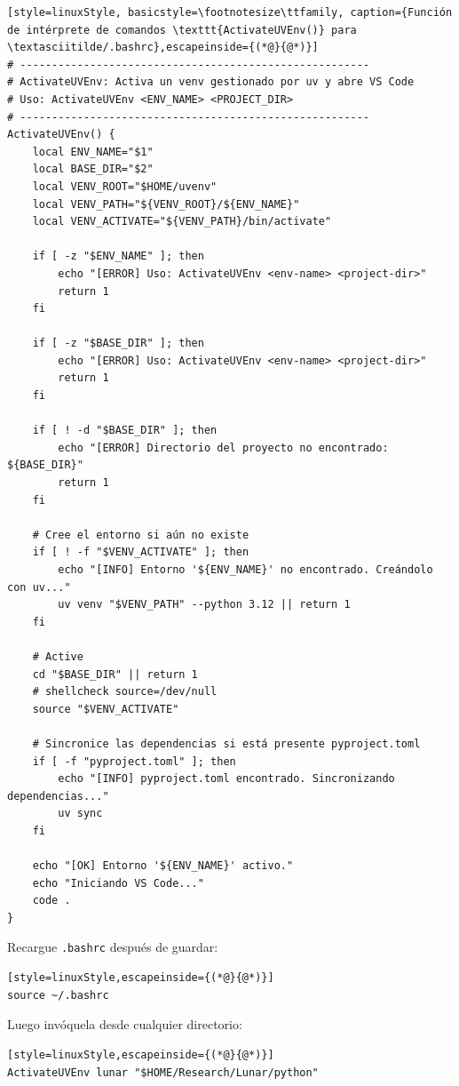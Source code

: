 \begin{lstlisting}[style=linuxStyle, basicstyle=\footnotesize\ttfamily, caption={Función de intérprete de comandos \texttt{ActivateUVEnv()} para \textasciitilde/.bashrc},escapeinside={(*@}{@*)}]
# -------------------------------------------------------
# ActivateUVEnv: Activa un venv gestionado por uv y abre VS Code
# Uso: ActivateUVEnv <ENV_NAME> <PROJECT_DIR>
# -------------------------------------------------------
ActivateUVEnv() {
    local ENV_NAME="$1"
    local BASE_DIR="$2"
    local VENV_ROOT="$HOME/uvenv"
    local VENV_PATH="${VENV_ROOT}/${ENV_NAME}"
    local VENV_ACTIVATE="${VENV_PATH}/bin/activate"

    if [ -z "$ENV_NAME" ]; then
        echo "[ERROR] Uso: ActivateUVEnv <env-name> <project-dir>"
        return 1
    fi

    if [ -z "$BASE_DIR" ]; then
        echo "[ERROR] Uso: ActivateUVEnv <env-name> <project-dir>"
        return 1
    fi

    if [ ! -d "$BASE_DIR" ]; then
        echo "[ERROR] Directorio del proyecto no encontrado: ${BASE_DIR}"
        return 1
    fi

    # Cree el entorno si aún no existe
    if [ ! -f "$VENV_ACTIVATE" ]; then
        echo "[INFO] Entorno '${ENV_NAME}' no encontrado. Creándolo con uv..."
        uv venv "$VENV_PATH" --python 3.12 || return 1
    fi

    # Active
    cd "$BASE_DIR" || return 1
    # shellcheck source=/dev/null
    source "$VENV_ACTIVATE"

    # Sincronice las dependencias si está presente pyproject.toml
    if [ -f "pyproject.toml" ]; then
        echo "[INFO] pyproject.toml encontrado. Sincronizando dependencias..."
        uv sync
    fi

    echo "[OK] Entorno '${ENV_NAME}' activo."
    echo "Iniciando VS Code..."
    code .
}
\end{lstlisting}

Recargue \texttt{.bashrc} después de guardar:

\begin{lstlisting}[style=linuxStyle,escapeinside={(*@}{@*)}]
source ~/.bashrc
\end{lstlisting}

Luego invóquela desde cualquier directorio:

\begin{lstlisting}[style=linuxStyle,escapeinside={(*@}{@*)}]
ActivateUVEnv lunar "$HOME/Research/Lunar/python"
\end{lstlisting}

